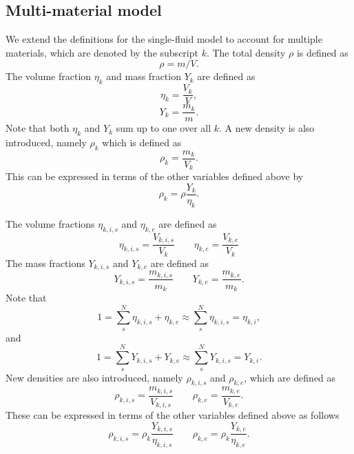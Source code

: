 \documentclass[a4paper,11pt]{report}
\begin{document}
\subsection{Multi-material model}
We extend the definitions for the single-fluid model to account for multiple materials, which are denoted by the subscript $k$.
The total density $\rho$ is defined as
\begin{equation}
    \rho = m/V.
\end{equation}
The volume fraction $\eta_k$ and mass fraction $Y_k$ are defined as
\begin{equation}
    \eta_k = \frac{V_k}{V},
\end{equation}
\begin{equation}
    Y_k = \frac{m_k}{m}.
\end{equation}
Note that both $\eta_k$ and $Y_k$ sum up to one over all $k$. A new density is also introduced, namely $\rho_k$ which is defined as
\begin{equation}
    \rho_k= \frac{m_k}{V_k}.
\end{equation}
This can be expressed in terms of the other variables defined above by
\begin{equation}
    \rho_k = \rho \frac{Y_k}{\eta_k}.
\end{equation}

The volume fractions $\eta_{k,i,s}$ and $\eta_{k,e}$ are defined as 
\begin{equation}
    \eta_{k,i,s} = \frac{V_{k,i,s}}{V_k} \qquad \eta_{k,e} = \frac{V_{k,e}}{V_k}
\end{equation}
The mass fractions $Y_{k,i,s}$ and $Y_{k,e}$ are defined as
\begin{equation}
    Y_{k,i,s} = \frac{m_{k,i,s}}{m_k} \qquad Y_{k,e} = \frac{m_{k,e}}{m_k}.
\end{equation}
Note that
\begin{equation}
    1 = \sum_s^N \eta_{k,i,s} + \eta_{k,e} \approx \sum_s^N \eta_{k,i,s} = \eta_{k,i},
\end{equation}
and
\begin{equation}
    1 = \sum_s^N Y_{k,i,s} + Y_{k,e} \approx \sum_s^N Y_{k,i,s} = Y_{k,i}.
\end{equation}
New densities are also introduced, namely $\rho_{k,i,s}$ and $\rho_{k,e}$, which are defined as
\begin{equation}
    \rho_{k,i,s}= \frac{m_{k,i,s}}{V_{k,i,s}} \qquad \rho_{k,e}= \frac{m_{k,e}}{V_{k,e}}.
\end{equation}
These can be expressed in terms of the other variables defined above as follows
\begin{equation}
    \rho_{k,i,s} = \rho_k \frac{Y_{k,i,s}}{\eta_{k,i,s}} \qquad \rho_{k,e} = \rho_k \frac{Y_{k,e}}{\eta_{k,e}}.
\end{equation}
\end{document}

